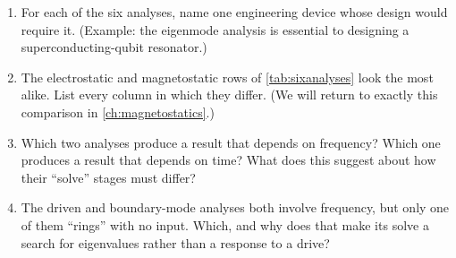\exercisessection
\begin{enumerate}[nosep]
  \item For each of the six analyses, name one engineering device whose design
  would require it. (Example: the eigenmode analysis is essential to designing a
  superconducting-qubit resonator.)
  \item The electrostatic and magnetostatic rows of \cref{tab:sixanalyses} look
  the most alike. List every column in which they differ. (We will return to
  exactly this comparison in \cref{ch:magnetostatics}.)
  \item Which two analyses produce a result that depends on frequency? Which one
  produces a result that depends on time? What does this suggest about how their
  ``solve'' stages must differ?
  \item The driven and boundary-mode analyses both involve frequency, but only
  one of them ``rings'' with no input. Which, and why does that make its solve a
  search for eigenvalues rather than a response to a drive?
\end{enumerate}
